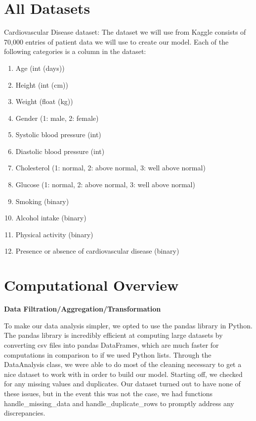 ﻿\documentclass[12pt]{article}
\begin{document}
\section*{All Datasets}
Cardiovascular Disease dataset: The dataset we will use from Kaggle consists of 70,000 entries of patient data we will use to create our model. Each of the following categories is a column in the dataset: 
\begin{enumerate}
\item Age (int (days))
\item Height (int (cm))
\item Weight (float (kg))
\item Gender (1: male, 2: female)
\item Systolic blood pressure (int)
\item Diastolic blood pressure (int)
\item Cholesterol (1: normal, 2: above normal, 3: well above normal)
\item Glucose (1: normal, 2: above normal, 3: well above normal)
\item Smoking (binary)
\item Alcohol intake (binary)
\item Physical activity (binary)
\item Presence or absence of cardiovascular disease (binary)
\end{enumerate}


\section*{Computational Overview}
\textbf{Data Filtration/Aggregation/Transformation}
\vspace{5mm}

To make our data analysis simpler, we opted to use the pandas library in Python. The pandas library is incredibly efficient at computing large datasets by converting csv files into pandas DataFrames, which are much faster for computations in comparison to if we used Python lists. Through the DataAnalysis class, we were able to do most of the cleaning necessary to get a nice dataset to work with in order to build our model. Starting off, we checked for any missing values and duplicates. Our dataset turned out to have none of these issues, but in the event this was not the case, we had functions handle\_missing\_data and handle\_duplicate\_rows to promptly address any discrepancies. 
\end{document}
